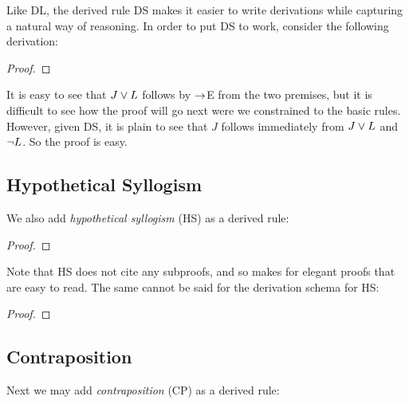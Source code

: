 Like DL, the derived rule DS makes it easier to write derivations while capturing a natural way of reasoning.
In order to put DS to work, consider the following derivation:


\begin{proof}
	  
	 
	 
\end{proof}

It is easy to see that $J\vee L$ follows by $\rightarrow$E from the two premises, but it is difficult to see how the proof will go next were we constrained to the basic rules.
However, given DS, it is plain to see that $J$ follows immediately from $J\vee L$ and $\neg L$. 
So the proof is easy.





\subsection{Hypothetical Syllogism}

We also add \textit{hypothetical syllogism} (HS) as a derived rule:

\begin{proof}
\end{proof}

Note that HS does not cite any subproofs, and so makes for elegant proofs that are easy to read.
The same cannot be said for the derivation schema for HS:

\begin{proof}
  \open 
     \as{}
     
     
  \close
   
\end{proof}


\subsection{Contraposition}

Next we may add \textit{contraposition} (CP) as a derived rule:

